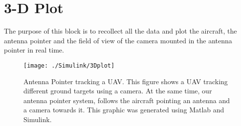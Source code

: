 \section{3-D Plot}

The purpose of this block is to recollect all the data and plot the aircraft, the antenna pointer and the field of view of the camera mounted in the antenna pointer in real time.
\begin{figure}[h!]
  \centering
  \texttt{[image: ./Simulink/3Dplot]}
  \label{fig:3dplot}
  \caption[Antenna Pointer tracking a UAV.]{Antenna Pointer tracking a UAV. This figure shows a UAV tracking different ground targets using a camera. At the same time, our antenna pointer system, follows the aircraft pointing an antenna and a camera towards it. This graphic was generated using Matlab and Simulink.}
\end{figure}